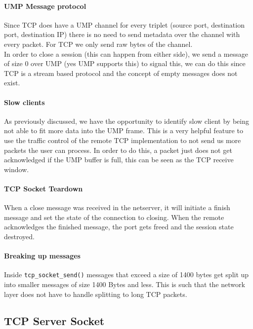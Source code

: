 \paragraph{UMP Message protocol}

Since TCP does have a UMP channel for every triplet (source port, destination port, destination IP) there is no need to send metadata over the channel with every packet. For TCP we only send raw bytes of the channel.\\
In order to close a session (this can happen from either side), we send a message of size 0 over UMP (yes UMP supports this) to signal this, we can do this since TCP is a stream based protocol and the concept of empty messages does not exist.

\paragraph{Slow clients}
As previously discussed, we have the opportunity to identify slow client by being not able to fit more data into the UMP frame. This is a very helpful feature to use the traffic control of the remote TCP implementation to not send us more packets the user can process. In order to do this, a packet just does not get acknowledged if the UMP buffer is full, this can be seen as the TCP receive window.

\paragraph{TCP Socket Teardown}
When a close message was received in the netserver, it will initiate a finish message and set the state of the connection to closing. When the remote acknowledges the finished message, the port gets freed and the session state destroyed.

\paragraph{Breaking up messages}

Inside \texttt{tcp_socket_send()} messages that exceed a size of 1400 bytes get split up into smaller messages of size 1400 Bytes and less. This is such that the network layer does not have to handle splitting to long TCP packets.


\subsection{TCP Server Socket}

